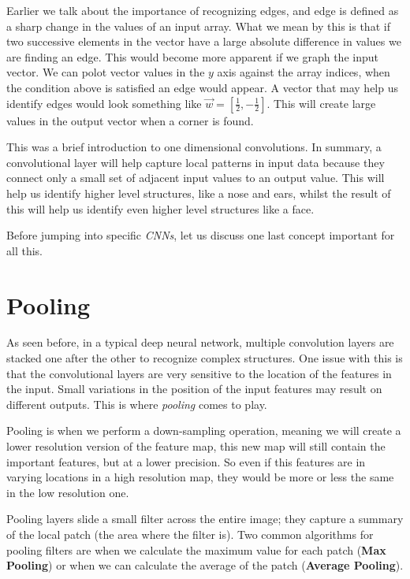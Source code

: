\documentclass[10pt, twocolumn]{article}
\begin{document}
Earlier we talk about the importance of recognizing edges, and edge is defined
as a sharp change in the values of an input array. What we mean by this is
that if two successive elements in the vector have a large absolute difference
in values we are finding an edge. This would become more apparent if we graph
the input vector. We can polot vector values in the $y$ axis against the array
indices, when the condition above is satisfied an edge would appear. A vector
that may help us identify edges would look something like $\vec{w} =
[\frac{1}{2},-\frac{1}{2}]$. This will create large values in the output vector
when a corner is found.

This was a brief introduction to one dimensional convolutions.  In summary, a
convolutional layer will help capture local patterns in input data because they
connect only a small set of adjacent input values to an output value. This will
help us identify higher level structures, like a nose and ears, whilst the
result of this will help us identify even higher level structures like a face.

Before jumping into specific \emph{CNNs}, let us discuss one last concept
important for all this.

\section{Pooling}

As seen before, in a typical deep neural network, multiple convolution layers
are stacked one after the other to recognize complex structures. One issue with
this is that the convolutional layers are very sensitive to the location of the
features in the input. Small variations in the position of the input features
may result on different outputs. This is where \emph{pooling} comes to play.

Pooling is when we perform a down-sampling operation, meaning we will create a
lower resolution version of the feature map, this new map will still contain the
important features, but at a lower precision. So even if this features are in
varying locations in a high resolution map, they would be more or less the same
in the low resolution one.

Pooling layers slide a small filter across the entire image; they capture a
summary of the local patch (the area where the filter is). Two common
algorithms for pooling filters are when we calculate the maximum value for each
patch (\textbf{Max Pooling}) or when we can calculate the average of the patch
(\textbf{Average Pooling}).
\end{document}

